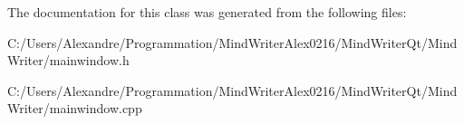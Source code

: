 The documentation for this class was generated from the following files\-:\begin{DoxyCompactItemize}
\item 
C\-:/\-Users/\-Alexandre/\-Programmation/\-Mind\-Writer\-Alex0216/\-Mind\-Writer\-Qt/\-Mind\-Writer/mainwindow.\-h\item 
C\-:/\-Users/\-Alexandre/\-Programmation/\-Mind\-Writer\-Alex0216/\-Mind\-Writer\-Qt/\-Mind\-Writer/mainwindow.\-cpp\end{DoxyCompactItemize}
